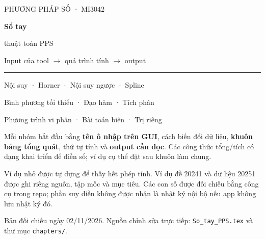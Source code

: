 \documentclass[11pt,a4paper,oneside,openany]{book}
\begin{document}
\frontmatter
\begin{titlepage}
\color{teal!65!black}\sffamily
\vspace*{18mm}
{\large PHƯƠNG PHÁP SỐ · MI3042\par}
\vspace{12mm}
{\Huge\bfseries Sổ tay\par thuật toán PPS\par}
\vspace{8mm}
{\Large Input của tool $\longrightarrow$ quá trình tính $\longrightarrow$ output\par}
\vspace{12mm}
\rule{\textwidth}{1.2pt}
\vspace{4mm}
{\large Nội suy · Horner · Nội suy ngược · Spline\par
 Bình phương tối thiểu · Đạo hàm · Tích phân\par
 Phương trình vi phân · Bài toán biên · Trị riêng\par}
\vfill
\color{black}\rmfamily
Mỗi nhóm bắt đầu bằng \textbf{tên ô nhập trên GUI}, cách biến đổi dữ liệu, \textbf{khuôn bảng tổng quát}, thứ tự tính và \textbf{output cần đọc}. Các công thức tổng/tích có dạng khai triển để điền số; ví dụ cụ thể đặt sau khuôn làm chung.

Ví dụ nhỏ được tự dựng để thấy hết phép tính. Ví dụ đề 20241 và dữ liệu 20251 được ghi riêng nguồn, tập mốc và mục tiêu. Các con số được đối chiếu bằng công cụ trong repo; phần suy diễn không được nhận là nhật ký nội bộ nếu app không lưu nhật ký đó.
\vspace{8mm}
{\small Bản đối chiếu ngày 02/11/2026. Nguồn chỉnh sửa trực tiếp: \texttt{So\_tay\_PPS.tex} và thư mục \texttt{chapters/}.\par}
\end{titlepage}
\tableofcontents

\mainmatter







\appendix



\end{document}
